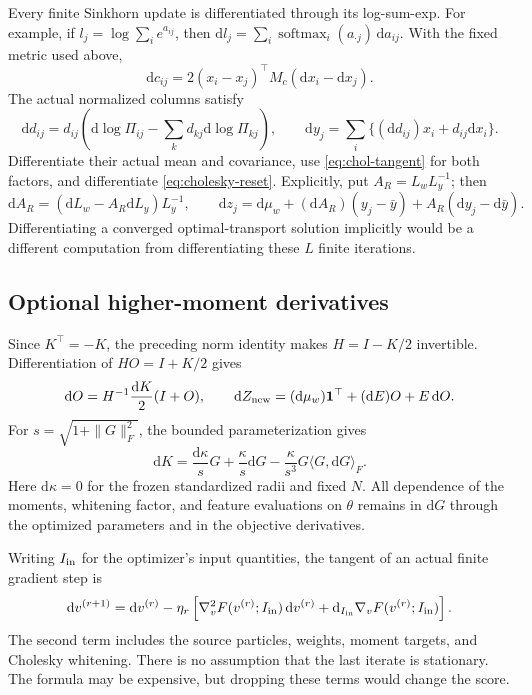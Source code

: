 \documentclass[11pt,a4paper]{article}
\newcommand{\one}{\mathbf 1}
\newcommand{\dd}{\mathrm d}
\newcommand{\softmax}{\operatorname{softmax}}
\begin{document}
Every finite Sinkhorn update is differentiated through its log-sum-exp.
For example, if \(l_j=\log\sum_i e^{a_{ij}}\), then
\(\dd l_j=\sum_i\softmax_i(a_{\cdot j})\,\dd a_{ij}\).
With the fixed metric used above,
\[
 \dd c_{ij}
 =2(x_i-x_j)^\top M_c(\dd x_i-\dd x_j).
\]
The actual normalized columns satisfy
\[
 \dd d_{ij}
 =d_{ij}\left(\dd\log\Pi_{ij}
       -\sum_kd_{kj}\dd\log\Pi_{kj}\right),\qquad
 \dd y_j=\sum_i\{(\dd d_{ij})x_i+d_{ij}\dd x_i\}.
\]
Differentiate their actual mean and covariance, use
\eqref{eq:chol-tangent} for both factors, and differentiate
\eqref{eq:cholesky-reset}. Explicitly, put
\(A_R=L_wL_y^{-1}\); then
\[
 \dd A_R=(\dd L_w-A_R\dd L_y)L_y^{-1},\qquad
 \dd z_j=\dd\mu_w+(\dd A_R)(y_j-\bar y)
                         +A_R(\dd y_j-\dd\bar y).
\]
Differentiating a converged optimal-transport solution implicitly would
be a different computation from differentiating these \(L\) finite
iterations.

\subsection{Optional higher-moment derivatives}

Since \(K^\top=-K\), the preceding norm identity makes
\(H=I-K/2\) invertible. Differentiation of \(HO=I+K/2\) gives
\begin{equation}
\label{eq:cayley-tangent}
 \dd O=H^{-1}\frac{\dd K}{2}(I+O),\qquad
 \dd Z_{\rm new}=(\dd\mu_w)\one^\top+(\dd E)O+E\,\dd O .
\end{equation}
For \(s=\sqrt{1+\|G\|_F^2}\), the bounded parameterization gives
\[
 \dd K=\frac{\dd\kappa}{s}G+\frac{\kappa}{s}\dd G
       -\frac{\kappa}{s^3}G\langle G,\dd G\rangle_F.
\]
Here \(\dd\kappa=0\) for the frozen standardized radii and fixed \(N\).
All dependence of the moments, whitening factor, and feature evaluations
on \(\theta\) remains in \(\dd G\) through the optimized parameters
and in the objective derivatives.

Writing \(I_{\rm in}\) for the optimizer's input quantities, the tangent
of an actual finite gradient step is
\begin{equation}
\label{eq:optimizer-tangent}
 \dd v^{(r+1)}
 =\dd v^{(r)}
 -\eta_r\left[
   \nabla_v^2F(v^{(r)};I_{\rm in})\,\dd v^{(r)}
   +\dd_{I_{\rm in}}\nabla_vF(v^{(r)};I_{\rm in})\right].
\end{equation}
The second term includes the source particles, weights, moment targets,
and Cholesky whitening. There is no assumption that the last iterate is
stationary. The formula may be expensive, but dropping these terms would
change the score.
\end{document}
